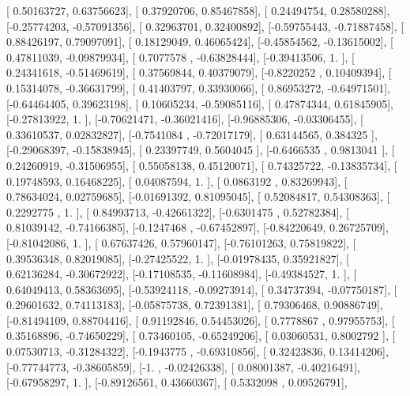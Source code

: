 \documentclass{article}
\begin{document}
       [ 0.50163727,  0.63756623],
       [ 0.37920706,  0.85467858],
       [ 0.24494754,  0.28580288],
       [-0.25774203, -0.57091356],
       [ 0.32963701,  0.32400892],
       [-0.59755443, -0.71887458],
       [ 0.88426197,  0.79097091],
       [ 0.18129049,  0.46065424],
       [-0.45854562, -0.13615002],
       [ 0.47811039, -0.09879934],
       [ 0.7077578 , -0.63828444],
       [-0.39413506,  1.        ],
       [ 0.24341618, -0.51469619],
       [ 0.37569844,  0.40379079],
       [-0.8220252 ,  0.10409394],
       [ 0.15314078, -0.36631799],
       [ 0.41403797,  0.33930066],
       [ 0.86953272, -0.64971501],
       [-0.64464405,  0.39623198],
       [ 0.10605234, -0.59085116],
       [ 0.47874344,  0.61845905],
       [-0.27813922,  1.        ],
       [-0.70621471, -0.36021416],
       [-0.96885306, -0.03306455],
       [ 0.33610537,  0.02832827],
       [-0.7541084 , -0.72017179],
       [ 0.63144565,  0.384325  ],
       [-0.29068397, -0.15838945],
       [ 0.23397749,  0.5604045 ],
       [-0.6466535 ,  0.9813041 ],
       [ 0.24260919, -0.31506955],
       [ 0.55058138,  0.45120071],
       [ 0.74325722, -0.13835734],
       [ 0.19748593,  0.16468225],
       [ 0.04087594,  1.        ],
       [ 0.0863192 ,  0.83269943],
       [ 0.78634024,  0.02759685],
       [-0.01691392,  0.81095045],
       [ 0.52084817,  0.54308363],
       [ 0.2292775 ,  1.        ],
       [ 0.84993713, -0.42661322],
       [-0.6301475 ,  0.52782384],
       [ 0.81039142, -0.74166385],
       [-0.1247468 , -0.67452897],
       [-0.84220649,  0.26725709],
       [-0.81042086,  1.        ],
       [ 0.67637426,  0.57960147],
       [-0.76101263,  0.75819822],
       [ 0.39536348,  0.82019085],
       [-0.27425522,  1.        ],
       [-0.01978435,  0.35921827],
       [ 0.62136284, -0.30672922],
       [-0.17108535, -0.11608984],
       [-0.49384527,  1.        ],
       [ 0.64049413,  0.58363695],
       [-0.53924118, -0.09273914],
       [ 0.34737394, -0.07750187],
       [ 0.29601632,  0.74113183],
       [-0.05875738,  0.72391381],
       [ 0.79306468,  0.90886749],
       [-0.81494109,  0.88704416],
       [ 0.91192846,  0.54453026],
       [ 0.7778867 ,  0.97955753],
       [ 0.35168896, -0.74650229],
       [ 0.73460105, -0.65249206],
       [ 0.03060531,  0.8002792 ],
       [ 0.07530713, -0.31284322],
       [-0.1943775 , -0.69310856],
       [ 0.32423836,  0.13414206],
       [-0.77744773, -0.38605859],
       [-1.        , -0.02426338],
       [ 0.08001387, -0.40216491],
       [-0.67958297,  1.        ],
       [-0.89126561,  0.43660367],
       [ 0.5332098 ,  0.09526791],
\end{document}
